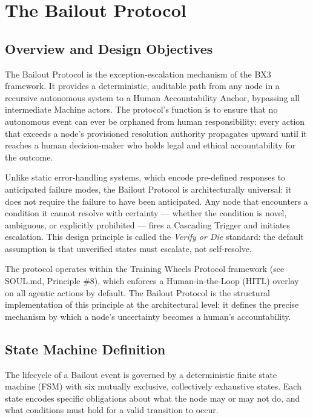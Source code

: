 \section{The Bailout Protocol}

\subsection{Overview and Design Objectives}

The Bailout Protocol is the exception-escalation mechanism of the BX3 framework. It provides a deterministic, auditable path from any node in a recursive autonomous system to a Human Accountability Anchor, bypassing all intermediate Machine actors. The protocol's function is to ensure that no autonomous event can ever be orphaned from human responsibility: every action that exceeds a node's provisioned resolution authority propagates upward until it reaches a human decision-maker who holds legal and ethical accountability for the outcome.

Unlike static error-handling systems, which encode pre-defined responses to anticipated failure modes, the Bailout Protocol is architecturally universal: it does not require the failure to have been anticipated. Any node that encounters a condition it cannot resolve with certainty — whether the condition is novel, ambiguous, or explicitly prohibited — fires a Cascading Trigger and initiates escalation. This design principle is called the \emph{Verify or Die} standard: the default assumption is that unverified states must escalate, not self-resolve.

The protocol operates within the Training Wheels Protocol framework (see SOUL.md, Principle \#8), which enforces a Human-in-the-Loop (HITL) overlay on all agentic actions by default. The Bailout Protocol is the structural implementation of this principle at the architectural level: it defines the precise mechanism by which a node's uncertainty becomes a human's accountability.

\subsection{State Machine Definition}

The lifecycle of a Bailout event is governed by a deterministic finite state machine (FSM) with six mutually exclusive, collectively exhaustive states. Each state encodes specific obligations about what the node may or may not do, and what conditions must hold for a valid transition to occur.

